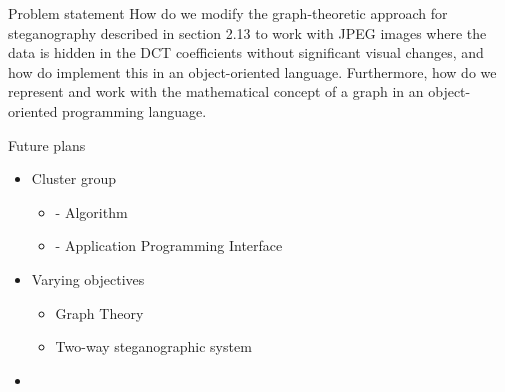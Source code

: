 
	
		





\begin{frame}{Problem statement}{}
How do we modify the graph-theoretic approach
for steganography described in section 2.13 to work
with JPEG images where the data is hidden in the
DCT coefficients without significant visual changes,
and how do implement this in an object-oriented
language. Furthermore, how do we represent and
work with the mathematical concept of a graph in
an object-oriented programming language.
\end{frame}



\begin{frame}{Future plans}{}
	\begin{itemize}
		\item Cluster group
        \begin{itemize}
            \item {} - Algorithm 
            \item {} - Application Programming Interface
        \end{itemize}
		\item Varying objectives
        \begin{itemize}
            \item Graph Theory 
            \item Two-way steganographic system
        \end{itemize}
		\item
	\end{itemize}
\end{frame}



